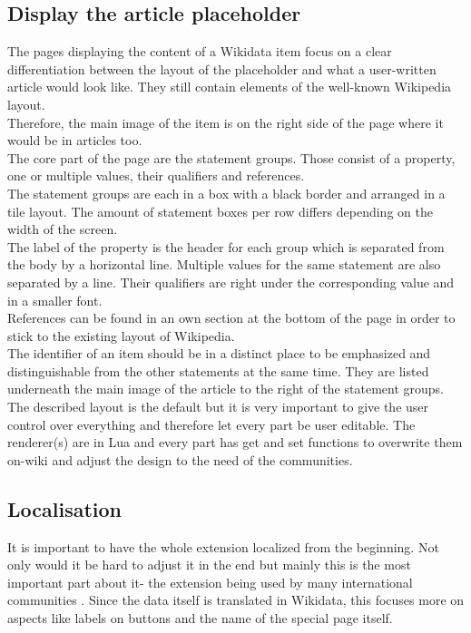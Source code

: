 \documentclass[11pt]{article}
\begin{document}
  \subsection{Display the article placeholder}
  The pages displaying the content of a Wikidata item focus on a clear differentiation between the layout of the placeholder and what a user-written article would look like. They still contain elements of the well-known Wikipedia layout. \\
  Therefore, the main image of the item is on the right side of the page where it would be in articles too.\\
  The core part of the page are the statement groups. Those consist of a property, one or multiple values, their qualifiers and references. \\
  The statement groups are each in a box with a black border and arranged in a tile layout. The amount of statement boxes per row differs depending on the width of the screen.\\
  The label of the property is the header for each group which is separated from the body by a horizontal line. Multiple values for the same statement are also separated by a line. Their qualifiers are right under the corresponding value and in a smaller font. \\
  References can be found in an own section at the bottom of the page in order to stick to the existing layout of Wikipedia. \\
  The identifier of an item should be in a distinct place to be emphasized and distinguishable from the other statements at the same time. They are listed underneath the main image of the article to the right of the statement groups. \\
  The described layout is the default but it is very important to give the user control over everything and therefore let every part be user editable. The renderer(s) are in Lua and every part has get and set functions to overwrite them on-wiki and adjust the design to the need of the communities. \\

  \subsection{Localisation}
  It is important to have the whole extension localized from the beginning. Not only would it be hard to adjust it in the end but mainly this is the most important part about it- the extension being used by many international communities%
  . Since the data itself is translated in Wikidata, this focuses more on aspects like labels on buttons and the name of the special page itself. \\
\end{document}
